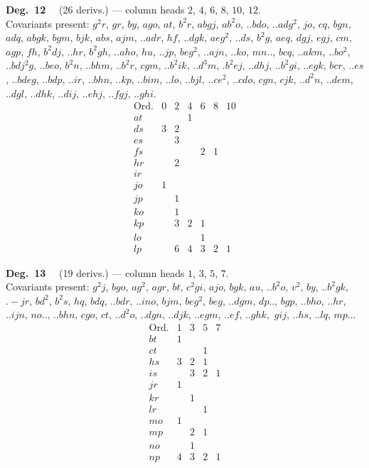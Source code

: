 \documentclass[11pt]{article}
\begin{document}
\noindent\textbf{Deg.~12} \ \ (26 derivs.) --- column heads $2$, $4$, $6$, $8$, $10$, $12$. \\
Covariants present: $g^{2}r$, $gr$, $by$, $ago$, $at$, $b^{2}r$, $abgj$, $ab^{2}o$, $..bdo$, $..adg^{2}$, $jo$, $cq$, $bgn$, $adq$, $abgk$, $bgm$, $bjk$, $abs$, $ajm$, $..adr$, $hf$, $..dgk$, $aeg^{2}$, $..ds$, $b^{2}g$, $aeq$, $dgj$, $egj$, $cm$, $agp$, $fh$, $b^{2}dj$, $..hr$, $b^{2}gh$, $..aho$, $hu$, $..jp$, $beg^{2}$, $..ajn$, $..ko$, $mn..$, $bcq$, $..akm$, $..bo^{2}$, $..bdj^{2}g$, $..beo$, $b^{2}n$, $..bhm$, $..b^{2}r$, $cgm$, $..b^{2}ik$, $..d^{3}m$, $.b^{2}ej$, $..dhj$, $..b^{2}gi$, $..egk$, $bcr$, $..es$, $..bdeg$, $..bdp$, $..ir$, $..bhn$, $..kp$, $..bim$, $..lo$, $..bjl$, $..ce^{2}$, $..cdo$, $cgn$, $cjk$, $..d^{2}n$, $..dem$, $..dgl$, $..dhk$, $..dij$, $..ehj$, $..fgj$, $..ghi$.
\[
\begin{array}{l|cccccc}
\text{Ord.} & 0 & 2 & 4 & 6 & 8 & 10 \\\hline
at & & & 1 & & & \\
ds & 3 & 2 & & & & \\
es & & 3 & & & & \\
fs & & & & 2 & 1 & \\
hr & & 2 & & & & \\
ir & & & & & & \\
jo & 1 & & & & & \\
jp & & 1 & & & & \\
ko & & 1 & & & & \\
kp & & 3 & 2 & 1 & & \\
lo & & & & 1 & & \\
lp & & 6 & 4 & 3 & 2 & 1
\end{array}
\]

\bigskip

\noindent\textbf{Deg.~13} \ \ (19 derivs.) --- column heads $1$, $3$, $5$, $7$. \\
Covariants present: $g^{2}j$, $bgo$, $ag^{2}$, $agr$, $bt$, $c^{2}gi$, $ajo$, $bgk$, $au$, $..b^{2}o$, $v^{2}$, $by$, $..b^{2}gk$, $.-jr$, $bd^{2}$, $b^{2}s$, $hq$, $bdq$, $..bdr$, $..ino$, $bjm$, $beg^{2}$, $beg$, $..dgm$, $dp..$, $bgp$, $..bho$, $..hr$, $..ijn$, $no..$, $..bhn$, $cgo$, $ct$, $..d^{2}o$, $..dgn$, $..djk$, $..egm$, $..ef$, $..ghk$, $\,gij$, $..hs$, $..lq$, $mp..$.
\[
\begin{array}{l|cccc}
\text{Ord.} & 1 & 3 & 5 & 7 \\\hline
bt & 1 & & & \\
ct & & & 1 & \\
hs & 3 & 2 & 1 & \\
is & & 3 & 2 & 1 \\
jr & 1 & & & \\
kr & & 1 & & \\
lr & & & 1 & \\
mo & 1 & & & \\
mp & & 2 & 1 & \\
no & & 1 & & \\
np & 4 & 3 & 2 & 1
\end{array}
\]
\end{document}
